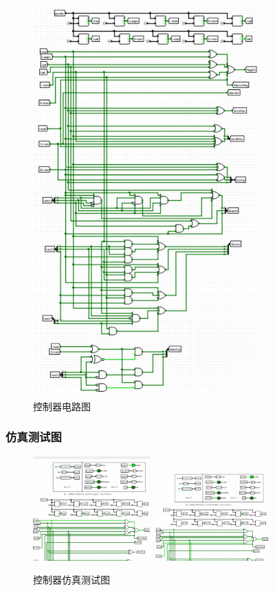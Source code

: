 \documentclass{article}
\begin{document}
    \begin{figure}[H]
    \centering
    \includegraphics[width=0.8\textwidth]{1.4.2.png}
    \caption{控制器电路图}
    \end{figure}

    \subsubsection{仿真测试图}
    \begin{figure}[H]
    \centering
    \includegraphics[width=0.4\textwidth]{1.5.1.png}
    \includegraphics[width=0.4\textwidth]{1.5.2.png}
    
    \caption{控制器仿真测试图}
    \end{figure}
\end{document}
